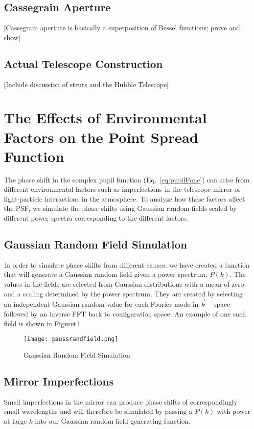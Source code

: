 \documentclass[%
 reprint,
 amsmath,amssymb,
 aps,
 pra,
]{revtex4-1}
\begin{document}
{\subsection{Cassegrain Aperture}\label{subsec:cassegrain-aperture}
[Cassegrain aperture is basically a superposition of Bessel functions; prove and show]

\subsection{Actual Telescope Construction}\label{subsec:actual-aperture}
[Include discussion of struts and the Hubble Telescope]

\section{The Effects of Environmental Factors on the Point Spread Function}\label{sec:environment}

The phase shift in the complex pupil function (Eq.~\ref{eq:pupilFunc}) can arise from different environmental factors such as imperfections in the telescope mirror or light-particle interactions in the atmosphere. To analyze how these factors affect the PSF, we simulate the phase shifts using Gaussian random fields scaled by different power spectra corresponding to the different factors.


\subsection{Gaussian Random Field Simulation}\label{subsec:gaussian-fields}
In order to simulate phase shifts from different causes, we have created a function that will generate a Gaussian random field given a power spectrum, $P(k)$. The values in the fields are selected from Gaussian distributions with a mean of zero and a scaling determined by the power spectrum. They are created by selecting an independent Gaussian random value for each Fourier mode in $\vec{k}-$space followed by an inverse FFT back to configuration space. An example of one such field is shown in Figuret\ref{fig:GaussianRandField}

\begin{figure}[h!]
  \centering
    \texttt{[image: gaussrandfield.png]}
  \caption{Gaussian Random Field Simulation}\label{fig:GaussianRandField}
\end{figure}

\subsection{Mirror Imperfections}\label{subsec:mirror-issues}
Small imperfections in the mirror can produce phase shifts of correspondingly small wavelengths and will therefore be simulated by passing a $P(k)$ with power at large $k$ into our Gaussian random field generating function.

}
\end{document}
